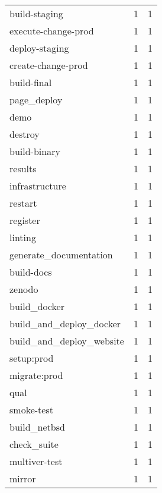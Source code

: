 \begin{tabular}{lrr}
build-staging              &                   1 &             1 \\
execute-change-prod        &                   1 &             1 \\
deploy-staging             &                   1 &             1 \\
create-change-prod         &                   1 &             1 \\
build-final                &                   1 &             1 \\
page\_deploy                &                   1 &             1 \\
demo                       &                   1 &             1 \\
destroy                    &                   1 &             1 \\
build-binary               &                   1 &             1 \\
results                    &                   1 &             1 \\
infrastructure             &                   1 &             1 \\
restart                    &                   1 &             1 \\
register                   &                   1 &             1 \\
linting                    &                   1 &             1 \\
generate\_documentation     &                   1 &             1 \\
build-docs                 &                   1 &             1 \\
zenodo                     &                   1 &             1 \\
build\_docker               &                   1 &             1 \\
build\_and\_deploy\_docker    &                   1 &             1 \\
build\_and\_deploy\_website   &                   1 &             1 \\
setup:prod                 &                   1 &             1 \\
migrate:prod               &                   1 &             1 \\
qual                       &                   1 &             1 \\
smoke-test                 &                   1 &             1 \\
build\_netbsd               &                   1 &             1 \\
check\_suite                &                   1 &             1 \\
multiver-test              &                   1 &             1 \\
mirror                     &                   1 &             1 \\
\bottomrule
\end{tabular}
